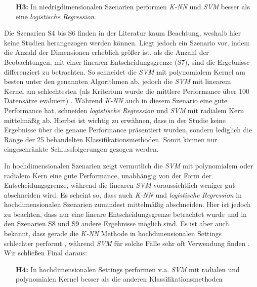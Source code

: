 \documentclass[
]{article}
\begin{document}
\begin{minipage}{0.9\linewidth}
\begin{itemize}[leftmargin=0.1\linewidth]
\item[\textbf{H3:}] In niedrigdimensionalen Szenarien performen \textit{K-NN} und \textit{SVM} besser als eine \textit{logistische Regression}.
\end{itemize}
\end{minipage}

Die Szenarien S4 bis S6 finden in der Literatur kaum Beachtung, weshalb
hier keine Studien herangezogen werden können. Liegt jedoch ein Szenario
vor, indem die Anzahl der Dimensionen erheblich größer ist, als die
Anzahl der Beobachtungen, mit einer linearen Entscheidungsgrenze (S7),
sind die Ergebnisse differenziert zu betrachten. So schneidet die
\textit{SVM} mit polynomialem Kernel am besten unter den genannten
Algorithmen ab, jedoch die \textit{SVM} mit linearem Kernel am
schlechtesten (als Kriterium wurde die mittlere Performance über 100
Datensätze evaluiert)
\parencite{scholzComparisonClassificationMethods2021}. Während
\textit{K-NN} auch in diesem Szenario eine gute Performance hat,
schneiden \textit{logistische Regression} und \textit{SVM} mit radialem
Kern mittelmäßig ab. Hierbei ist wichtig zu erwähnen, dass in der Studie
keine Ergebnisse über die genaue Performance präsentiert wurden, sondern
lediglich die Ränge der 25 behandelten Klassifikationsmethoden. Somit
können nur eingeschränkte Schlussfolgerungen gezogen werden.

In hochdimensionalen Szenarien zeigt vermutlich die \textit{SVM} mit
polynomialem oder radialem Kern eine gute Performance, unabhängig von
der Form der Entscheidungsgrenze, während die linearen \textit{SVM}
voraussichtlich weniger gut abschneiden wird. Es scheint so, dass auch
\textit{K-NN} und \textit{logistische Regression} in hochdimensionalen
Szenarien zumindest mittelmäßig abschneiden. Hier ist jedoch zu
beachten, dass nur eine lineare Entscheidungsgrenze betrachtet wurde und
in den Szenarien S8 und S9 andere Ergebnisse möglich sind. Es ist aber
auch bekannt, dass gerade die \textit{K-NN} Methode in hochdimensionalen
Settings schlechter performt
\parencite{jamesIntroductionStatisticalLearning2021}, während
\textit{SVM} für solche Fälle sehr oft Verwendung finden
\parencite{moguerzaSupportVectorMachines2006}. Wir schließen Final
daraus:

\begin{minipage}{0.9\linewidth}
\begin{itemize}[leftmargin=0.1\linewidth]
\item[\textbf{H4:}] In hochdimensionalen Settings performen v.a. \textit{SVM} mit radialen und polynomialen Kernel besser als die anderen Klassifikationsmethoden
\end{itemize}
\end{minipage}
\end{document}
